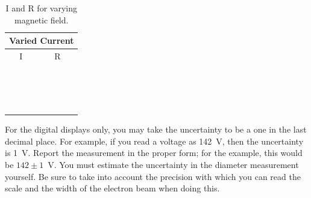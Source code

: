 \begin{table}[htb]
\begin{center}
\begin{tabular}{|c|c|}
\hline
\multicolumn{2}{|c|}{Varied Current}\\
\hline
I & R \\
\hline
\hspace*{5cm} & \hspace*{5cm} \\
& \\
\hline       
& \\
& \\
\hline
& \\
& \\
\hline
& \\
& \\
\hline
& \\
& \\
\hline
& \\
& \\
\hline
& \\
& \\
\hline
& \\
& \\
\hline
\end{tabular}
\end{center}
\caption{I and R for varying magnetic field.}
\label{tab:ed:varyb}
\end{table}

\noindent For the digital displays only, you may take the 
uncertainty to be a one in the last decimal place. For example, if you read a 
voltage as 142~V, then the uncertainty is 1~V.  Report the measurement in 
the proper form; for the example, this would be $142 \pm 1$~V. You must 
estimate the uncertainty in the diameter measurement yourself. Be sure to take 
into account the precision with which you can read the scale and the width of 
the electron beam when doing this. 
 
